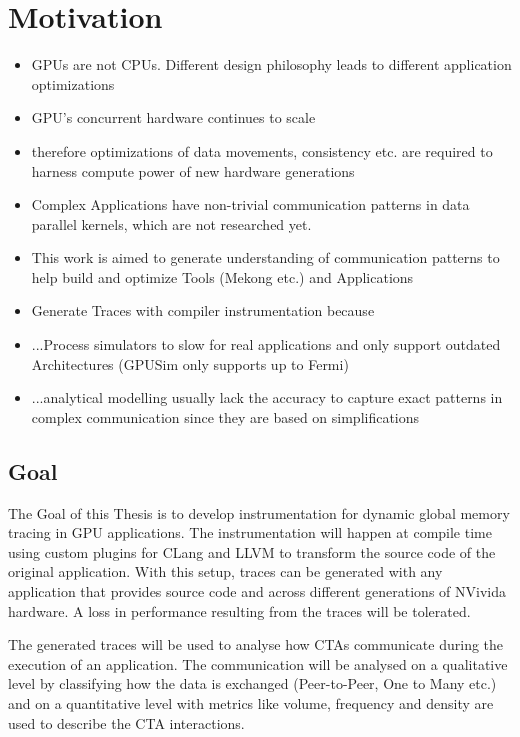 \chapter{Motivation}
\begin{itemize}
	\item GPUs are not CPUs. Different design philosophy leads to different application optimizations
	\item GPU's concurrent hardware continues to scale
	\item therefore optimizations of data movements, consistency etc. are required to harness compute power of new hardware generations
	\item Complex Applications have non-trivial communication patterns in data parallel kernels, which are not researched yet.
	\item This work is aimed to generate understanding of communication patterns to help build and optimize Tools (Mekong etc.) and Applications
	\item Generate Traces with compiler instrumentation because
	\item ...Process simulators to slow for real applications and only support outdated Architectures (GPUSim only supports up to Fermi)
	\item ...analytical modelling usually lack the accuracy to capture exact patterns in complex communication since they are based on simplifications
	
\end{itemize}
\section{Goal}
The Goal of this Thesis is to develop instrumentation for dynamic global memory tracing in GPU applications. The instrumentation will happen at compile time using custom plugins for CLang and LLVM to transform the source code of the
original application. With this setup, traces can be generated with any application that provides source code and
across different generations of NVivida hardware. A loss in performance resulting from the traces will be tolerated.

The generated traces will be used to analyse how CTAs communicate during the execution of an application. 
The communication will be analysed on a qualitative level by classifying how the data is exchanged (Peer-to-Peer, One to Many etc.) and on a quantitative level with metrics like volume, frequency and density are used to describe the CTA interactions.

